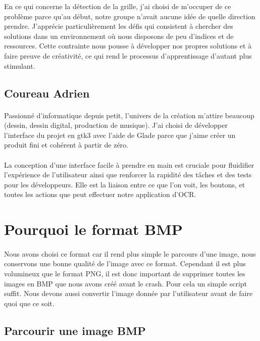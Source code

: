 \documentclass{article}
\begin{document}
En ce qui concerne la détection de la grille, j'ai choisi de m'occuper de ce problème parce qu'au début, notre groupe n'avait aucune idée de quelle direction prendre. J'apprécie particulièrement les défis qui consistent à chercher des solutions dans un environnement où nous disposons de peu d'indices et de ressources. Cette contrainte nous pousse à développer nos propres solutions et à faire preuve de créativité, ce qui rend le processus d'apprentissage d'autant plus stimulant.

\subsection{Coureau Adrien}
\paragraph{}
Passionné d'informatique depuis petit, l'univers de la création m'attire beaucoup (dessin, dessin digital, production de musique). J'ai choisi de développer l'interface du projet en gtk3 avec l'aide de Glade parce que j'aime créer un produit fini et cohérent à partir de zéro.
\paragraph{}
La conception d'une interface facile à prendre en main est cruciale pour fluidifier l'expérience de l'utilisateur ainsi que renforcer la rapidité des tâches et des tests pour les développeurs. Elle est la liaison entre ce que l'on voit, les boutons, et toutes les actions que peut effectuer notre application d'OCR.

\section{Pourquoi le format BMP}
\paragraph{}
Nous avons choisi ce format car il rend plus simple le parcours d’une image, nous conservons une bonne qualité de l’image avec ce format. Cependant il est plus volumineux que le format PNG, il est donc important de supprimer toutes les images en BMP que nous avons créé avant le crash. Pour cela un simple script suffit. Nous devons aussi convertir l’image donnée par l’utilisateur avant de faire quoi que ce soit.
\subsection{Parcourir une image BMP}
\end{document}

